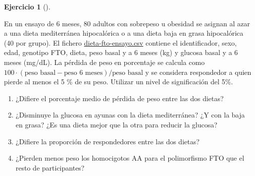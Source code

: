 \documentclass[
  spanish,
  a4paper,
]{scrreport}
\providecommand{\tightlist}{%
  \setlength{\itemsep}{0pt}\setlength{\parskip}{0pt}}
\theoremstyle{definition}
\newtheorem{exercise}{Ejercicio}[chapter]
\theoremstyle{remark}
\begin{document}
\begin{exercise}[]\protect\hypertarget{exr-contraste-ia-caso-integrador-dieta-fto}{}\label{exr-contraste-ia-caso-integrador-dieta-fto}

En un ensayo de 6 meses, 80 adultos con sobrepeso u obesidad se asignan
al azar a una dieta mediterránea hipocalórica o a una dieta baja en
grasa hipocalórica (40 por grupo). El fichero
\href{datos/dieta-fto-ensayo.csv}{dieta-fto-ensayo.csv} contiene el
identificador, sexo, edad, genotipo FTO, dieta, peso basal y a 6 meses
(kg) y glucosa basal y a 6 meses (mg/dL). La pérdida de peso en
porcentaje se calcula como
\(100\cdot(\text{peso basal}-\text{peso 6 meses})/\text{peso basal}\) y
se considera respondedor a quien pierde al menos el 5 \% de su peso.
Utilizar un nivel de significación del 5\%.

\begin{enumerate}
\def\labelenumi{\alph{enumi}.}
\tightlist
\item
  ¿Difiere el porcentaje medio de pérdida de peso entre las dos dietas?
\item
  ¿Disminuye la glucosa en ayunas con la dieta mediterránea? ¿Y con la
  baja en grasa? ¿Es una dieta mejor que la otra para reducir la
  glucosa?
\item
  ¿Difiere la proporción de respondedores entre las dos dietas?
\item
  ¿Pierden menos peso los homocigotos AA para el polimorfismo FTO que el
  resto de participantes?
\end{enumerate}

\end{exercise}
\end{document}
